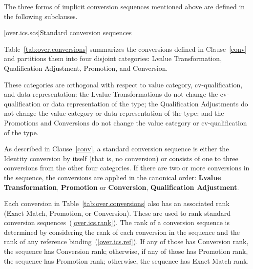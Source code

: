 \pnum
The three forms of implicit conversion sequences mentioned above
are defined in the following subclauses.

[over.ics.scs]{Standard conversion sequences}

\pnum
Table~\ref{tab:over.conversions}
summarizes the conversions defined in Clause~\ref{conv} and
partitions them into four disjoint categories: Lvalue Transformation,
Qualification Adjustment, Promotion, and Conversion.
\begin{note}
These categories are orthogonal with respect to value category,
cv-qualification, and data representation: the Lvalue Transformations
do not change the cv-qualification or data
representation of the type; the Qualification Adjustments do not
change the value category or data representation of the type; and
the Promotions and Conversions do not change the
value category or cv-qualification of the type.
\end{note}

\pnum
\begin{note}
As described in Clause~\ref{conv},
a standard conversion sequence is either the Identity conversion
by itself (that is, no conversion) or consists of one to three
conversions from the other
four categories.
If there are two or more conversions in the sequence, the
conversions are applied in the canonical order:
\textbf{Lvalue Transformation},
\textbf{Promotion}
or
\textbf{Conversion},
\textbf{Qualification Adjustment}.
\end{note}

\pnum
{}%
Each conversion in Table~\ref{tab:over.conversions}
also has an associated rank (Exact
Match, Promotion, or Conversion).
These are used
to rank standard conversion sequences~(\ref{over.ics.rank}).
The rank of a conversion sequence is determined by considering the
rank of each conversion in the sequence and the rank of any reference
binding~(\ref{over.ics.ref}).
If any of those has Conversion rank, the
sequence has Conversion rank; otherwise, if any of those has Promotion rank,
the sequence has Promotion rank; otherwise, the sequence has Exact
Match rank.


